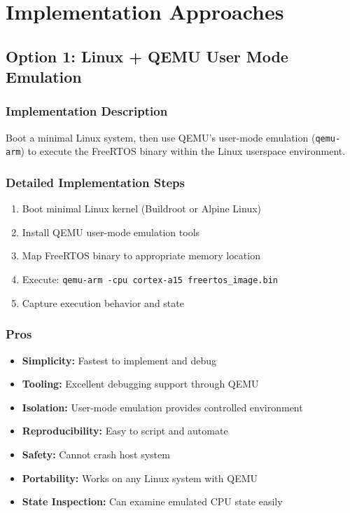 \documentclass[11pt,a4paper]{article}
\begin{document}
\section{Implementation Approaches}
\label{sec:approaches}

\subsection{Option 1: Linux + QEMU User Mode Emulation}

\subsubsection{Implementation Description}
Boot a minimal Linux system, then use QEMU's user-mode emulation (\texttt{qemu-arm}) to execute the FreeRTOS binary within the Linux userspace environment.

\subsubsection{Detailed Implementation Steps}
\begin{enumerate}
    \item Boot minimal Linux kernel (Buildroot or Alpine Linux)
    \item Install QEMU user-mode emulation tools
    \item Map FreeRTOS binary to appropriate memory location
    \item Execute: \texttt{qemu-arm -cpu cortex-a15 freertos\_image.bin}
    \item Capture execution behavior and state
\end{enumerate}

\subsubsection{Pros}
\begin{itemize}
    \item \textbf{Simplicity:} Fastest to implement and debug
    \item \textbf{Tooling:} Excellent debugging support through QEMU
    \item \textbf{Isolation:} User-mode emulation provides controlled environment
    \item \textbf{Reproducibility:} Easy to script and automate
    \item \textbf{Safety:} Cannot crash host system
    \item \textbf{Portability:} Works on any Linux system with QEMU
    \item \textbf{State Inspection:} Can examine emulated CPU state easily
\end{itemize}
\end{document}
